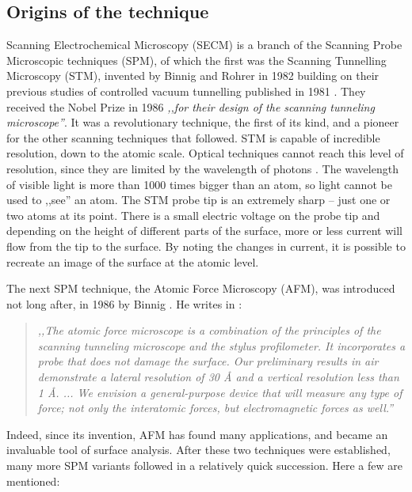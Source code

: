 \subsection{Origins of the technique}
Scanning Electrochemical Microscopy (SECM) is a branch of the Scanning Probe Microscopic techniques (SPM), of which the first was the Scanning Tunnelling Microscopy (STM), invented by Binnig and Rohrer in 1982\cite{binnig1982surface} building on their previous studies of controlled vacuum tunnelling published in 1981 \cite{binnig1982physica, binnig1982tunneling}.
They received the Nobel Prize in 1986 \emph{,,for their design of the scanning tunneling microscope''}.
It was a revolutionary technique, the first of its kind, and a pioneer for the other scanning techniques that followed.
STM is capable of incredible resolution, down to the atomic scale.
Optical techniques cannot reach this level of resolution, since they are limited by the wavelength of photons \cite{abbe1873beitrage}.
The wavelength of visible light is more than 1000 times bigger than an atom, so light cannot be used to ,,see'' an atom.
The STM probe tip is an extremely sharp -- just one or two atoms at its point.
There is a small electric voltage on the probe tip and depending on the height of different parts of the surface, more or less current will flow from the tip to the surface.
By noting the changes in current, it is possible to recreate an image of the surface at the atomic level.

The next SPM technique, the Atomic Force Microscopy (AFM), was introduced not long after, in 1986 by Binnig \cite{binnig1986atomic, bennig1988atomic}.
He writes in \cite{binnig1986atomic}:

\begin{quote}
\vspace{0.5cm}
\emph{,,The atomic force microscope is a combination of the principles of the scanning tunneling microscope and the stylus profilometer.
It incorporates a probe that does not damage the surface.
Our preliminary results in air demonstrate a lateral resolution of 30 \AA $ $ and a vertical resolution less than 1  \AA. ...
We envision a general-purpose device that will measure any type of force; not only the interatomic forces, but electromagnetic forces as well.''}
\vspace{0.5cm}
\end{quote}

Indeed, since its invention, AFM has found many applications, and became an invaluable tool of surface analysis.
After these two techniques were established, many more SPM variants followed in a relatively quick succession.
Here a few are mentioned:

